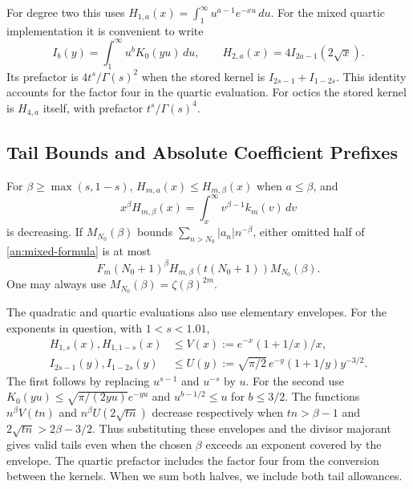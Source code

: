 For degree two this uses
$H_{1,a}(x)=\int_1^\infty u^{a-1}e^{-xu}\,du$.
For the mixed quartic implementation it is convenient to write
\[
 I_b(y)=\int_1^\infty u^bK_0(yu)\,du,\qquad
 H_{2,a}(x)=4I_{2a-1}(2\sqrt x).
\]
Its prefactor is $4t^s/\Gamma(s)^2$ when the stored kernel
is $I_{2s-1}+I_{1-2s}$. This identity accounts for the factor four
in the quartic evaluation. For octics the stored kernel is
$H_{4,a}$ itself, with prefactor $t^s/\Gamma(s)^4$.

\subsection{Tail Bounds and Absolute Coefficient Prefixes}
\label{an:tails}

For $\beta\geq\max(s,1-s)$,
$H_{m,a}(x)\leq H_{m,\beta}(x)$ when $a\leq\beta$, and
\[
 x^\beta H_{m,\beta}(x)=\int_x^\infty v^{\beta-1}k_m(v)\,dv
\]
is decreasing. If $M_{N_0}(\beta)$ bounds
$\sum_{n>N_0}|a_n|n^{-\beta}$, either omitted half of
\eqref{an:mixed-formula} is at most
\begin{equation}\label{an:general-tail}
 F_m (N_0+1)^\beta H_{m,\beta}(t(N_0+1))M_{N_0}(\beta).
\end{equation}
One may always use $M_{N_0}(\beta)=\zeta(\beta)^{2m}$.

The quadratic and quartic evaluations also use elementary envelopes.
For the exponents in question, with $1<s<1.01$,
\begin{align}
 H_{1,s}(x),H_{1,1-s}(x)&\leq
 V(x):=e^{-x}(1+1/x)/x,\label{an:exp-envelope}\\
 I_{2s-1}(y),I_{1-2s}(y)&\leq
 U(y):=\sqrt{\pi/2}\,e^{-y}(1+1/y)y^{-3/2}.
 \label{an:bessel-envelope}
\end{align}
The first follows by replacing $u^{s-1}$ and $u^{-s}$ by $u$.
For the second use $K_0(yu)\leq\sqrt{\pi/(2yu)}e^{-yu}$ and
$u^{b-1/2}\leq u$ for $b\leq3/2$.
The functions $n^\beta V(tn)$ and
$n^\beta U(2\sqrt{tn})$ decrease respectively when
$tn>\beta-1$ and $2\sqrt{tn}>2\beta-3/2$.
Thus substituting these envelopes and the divisor majorant gives
valid tails even when the chosen $\beta$ exceeds an exponent covered
by the envelope. The quartic prefactor includes the factor four from the conversion
between the kernels. When we sum both halves, we include both tail
allowances.

